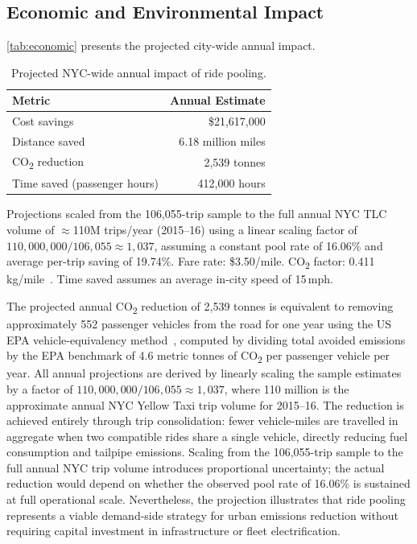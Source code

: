 \documentclass[a4paper,fleqn]{cas-dc}
\begin{document}
\subsection{Economic and Environmental Impact}

\autoref{tab:economic} presents the projected city-wide annual impact.

\begin{table}[t]
\centering
\caption{Projected NYC-wide annual impact of ride pooling.\label{tab:economic}}
\begin{threeparttable}
\begin{tabularx}{\columnwidth}{>{\raggedright\arraybackslash}X r}
\toprule
\textbf{Metric} & \textbf{Annual Estimate} \\
\midrule
Cost savings                  & \$21,617,000 \\
Distance saved                & 6.18 million miles \\
CO\textsubscript{2} reduction & 2,539 tonnes \\
Time saved (passenger hours)  & 412,000 hours \\
\bottomrule
\end{tabularx}
\begin{tablenotes}
  \small
  \item Projections scaled from the 106,055-trip sample to the full annual NYC TLC volume of $\approx$110M trips/year (2015--16) using a linear scaling factor of $110{,}000{,}000 / 106{,}055 \approx 1{,}037$, assuming a constant pool rate of 16.06\% and average per-trip saving of 19.74\%. Fare rate: \$3.50/mile. CO\textsubscript{2} factor: 0.411\,kg/mile~\cite{epa_emission_factors}. Time saved assumes an average in-city speed of 15\,mph.
\end{tablenotes}
\end{threeparttable}
\end{table}

The projected annual CO\textsubscript{2} reduction of 2,539 tonnes is equivalent to removing approximately 552 passenger vehicles from the road for one year using the US EPA vehicle-equivalency method~\cite{epa_equivalencies}, computed by dividing total avoided emissions by the EPA benchmark of 4.6 metric tonnes of CO\textsubscript{2} per passenger vehicle per year.  All annual projections are derived by linearly scaling the sample estimates by a factor of $110{,}000{,}000 / 106{,}055 \approx 1{,}037$, where 110 million is the approximate annual NYC Yellow Taxi trip volume for 2015--16.  The reduction is achieved entirely through trip consolidation: fewer vehicle-miles are travelled in aggregate when two compatible rides share a single vehicle, directly reducing fuel consumption and tailpipe emissions.  Scaling from the 106,055-trip sample to the full annual NYC trip volume introduces proportional uncertainty; the actual reduction would depend on whether the observed pool rate of 16.06\% is sustained at full operational scale.  Nevertheless, the projection illustrates that ride pooling represents a viable demand-side strategy for urban emissions reduction without requiring capital investment in infrastructure or fleet electrification.
\end{document}
